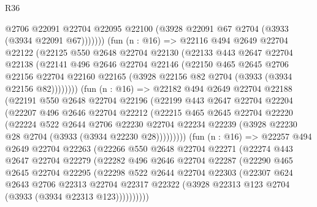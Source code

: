 \begin{lexlean}{R36}
\begin{coremodule}
                @2706
                @22091
                @22704
                @22095
                @22100
                (@3928 @22091 @67 @2704 (@3933 (@3934 @22091 @67)))))))
        (fun (n : @16) =>
        @22116
          @494
          @2649
          @22704
          @22122
          (@22125
            @550
            @2648
            @22704
            @22130
            (@22133
              @443
              @2647
              @22704
              @22138
              (@22141
                @496
                @2646
                @22704
                @22146
                (@22150
                  @465
                  @2645
                  @2706
                  @22156
                  @22704
                  @22160
                  @22165
                  (@3928 @22156 @82 @2704 (@3933 (@3934 @22156 @82))))))))
        (fun (n : @16) =>
        @22182
          @494
          @2649
          @22704
          @22188
          (@22191
            @550
            @2648
            @22704
            @22196
            (@22199
              @443
              @2647
              @22704
              @22204
              (@22207
                @496
                @2646
                @22704
                @22212
                (@22215
                  @465
                  @2645
                  @22704
                  @22220
                  (@22224
                    @522
                    @2644
                    @2706
                    @22230
                    @22704
                    @22234
                    @22239
                    (@3928 @22230 @28 @2704 (@3933 (@3934 @22230 @28)))))))))
        (fun (n : @16) =>
        @22257
          @494
          @2649
          @22704
          @22263
          (@22266
            @550
            @2648
            @22704
            @22271
            (@22274
              @443
              @2647
              @22704
              @22279
              (@22282
                @496
                @2646
                @22704
                @22287
                (@22290
                  @465
                  @2645
                  @22704
                  @22295
                  (@22298
                    @522
                    @2644
                    @22704
                    @22303
                    (@22307
                      @624
                      @2643
                      @2706
                      @22313
                      @22704
                      @22317
                      @22322
                      (@3928 @22313 @123 @2704 (@3933 (@3934 @22313 @123))))))))))

\end{coremodule}
\end{lexlean}

